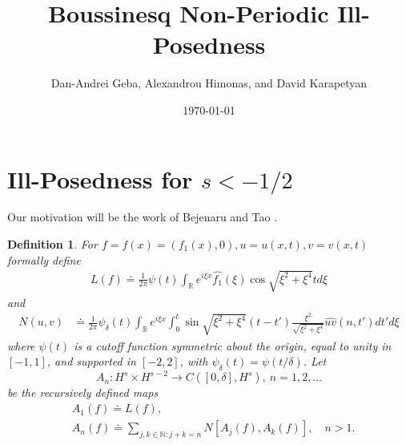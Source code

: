 \documentclass[12pt,reqno]{amsart}
\numberwithin{equation}{section}  %
\newcommand{\rr}{\mathbb{R}}
\newcommand{\wh}{\widehat}
\newtheorem{definition}[theorem]{Definition}
\begin{document}
\title{Boussinesq Non-Periodic Ill-Posedness}
\author{Dan-Andrei Geba, Alexandrou Himonas, and David Karapetyan}
\address{Department of Mathematics, University of Rochester, Rochester, NY 14627}
\address{Department of Mathematics, University of Notre Dame, Notre Dame, IN 46556}
\address{Department of Mathematics, University of Notre Dame, Notre Dame, IN 46556}
\date{\today}
%
%
\maketitle
%
%

%
%
%
%
%
%
\section{Ill-Posedness for $s < -1/2$}
Our motivation will be the work of Bejenaru and Tao
\cite{Bejenaru-Tao-2006-Sharp-well-posedness-and-ill-posedness}. 
%
\begin{definition}
  For $f =f(x)= (f_{1}(x), 0), u = u(x,t), v = v(x,t)$ formally define 
%
%
\begin{equation*}
\begin{split}
  L(f)
  \doteq \frac{1}{2 \pi} \psi(t) \int_{\rr} e^{i\xi x}
  \wh{f_{1}}(\xi) \cos \sqrt{\xi^{2} + \xi^{4}}t d \xi
  \end{split}
\end{equation*}
%
%
and
%
%
\begin{equation*}
\begin{split}
N(u, v)
& \doteq \frac{1}{2 \pi } \psi_{\delta}(t) \int_{\rr} e^{i\xi x}
\int_{0}^{t}\sin \sqrt{\xi^{2} + \xi^{4}}(t-t')
\frac{\xi^{2}}{\sqrt{\xi^{2} + \xi^{4}}}\wh{uv}(n, t') dt' d \xi
\end{split}
\end{equation*}
%
%
where $\psi(t)$ is a cutoff function
symmetric about the origin, equal to unity in $[-1,1]$, and supported in
$[-2, 2]$, with $\psi_{\delta}(t) = \psi(t/\delta)$.
Let $$A_{n}: H^{s} \times H^{s-2} \to C([0, \delta], H^{s}), \ n = 1, 2, \dots$$ be the
recursively defined maps
%
%
\begin{equation*}
\begin{split}
  & A_{1}(f) \doteq L(f),
  \\
  & A_{n}(f) \doteq \sum_{j, k \in \mathbb{N}: j + k = n} N\left[
  A_{j}(f), A_{k}(f) \right], \quad n > 1.
\end{split}
\end{equation*}
\end{definition}
\end{document}
